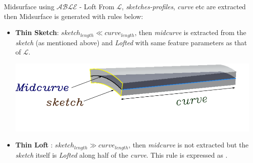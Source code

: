 \begin{frame}{Midsurface using $\mathcal{ABLE}$ - Loft}
From {\bf $\mathcal{L}$}, {\em sketches-profiles}, {\em curve} etc are extracted then Midsurface is generated with rules below:
\begin{itemize}[noitemsep,label=\textbullet,topsep=2pt,parsep=2pt,partopsep=2pt]
\item {\bf Thin Sketch}: $sketch_{length} \ll curve_{length}$, then {\em midcurve} is extracted from the {\em sketch} (as mentioned above) and {\em Lofted} with same feature parameters as that of  {\bf $\mathcal{L}$}. 

\vspace{2mm}
\begin{center}
\includegraphics[width=0.7\linewidth]{../Common/images//MidsurfSmallProfile.pdf}
 \end{center}
\item {\bf Thin Loft} :  $sketch_{length} \gg curve_{length}$, then {\em midcurve} is not extracted  but the {\em sketch} itself is {\em Lofted} along half of the {\em curve}. This rule is expressed as .
\end{itemize}
\end{frame}
